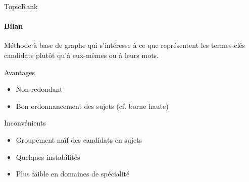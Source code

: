 \begin{frame}{TopicRank}\framesubtitle{Bilan}
  Méthode à base de graphe qui s'intéresse à ce que représentent les
  termes-clés candidats plutôt qu'à eux-mêmes ou à leurs mots.

  \vspace{1em}

  \begin{block}{Avantages}
    \begin{itemize}
      \item{Non redondant}
      \item{Bon ordonnancement des sujets (cf. borne haute)}
    \end{itemize}
  \end{block}

  \vspace{1em}

  \begin{alertblock}{Inconvénients}
    \begin{itemize}
      \item{Groupement naïf des candidats en sujets}
      \item{Quelques instabilités}
      \item{Plus faible en domaines de spécialité}
    \end{itemize}
  \end{alertblock}
\end{frame}

